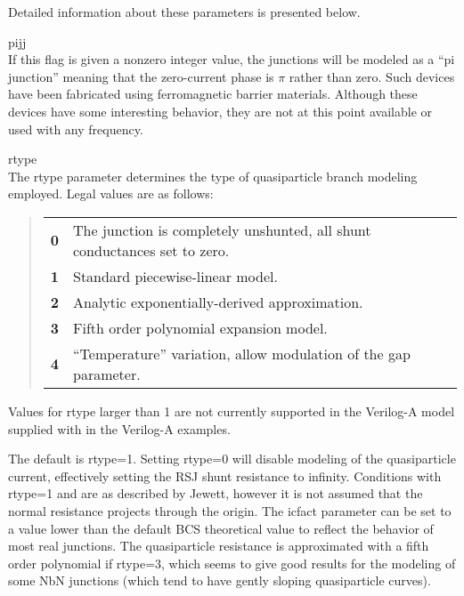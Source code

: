 Detailed information about these parameters is presented below.

\begin{description}
\item{\vt pijj}\\
If this flag is given a nonzero integer value, the junctions will be
modeled as a ``pi junction'' meaning that the zero-current phase is
$\pi$ rather than zero.  Such devices have been fabricated using
ferromagnetic barrier materials.  Although these devices have some
interesting behavior, they are not at this point available or used
with any frequency.

\item{\vt rtype}\\
The {\vt rtype} parameter determines the type of quasiparticle branch
modeling employed.  Legal values are as follows:

\begin{quote}
\begin{tabular}{ll}
\bf 0 & The junction is completely unshunted, all shunt conductances
 set to zero.\\
\bf 1 & Standard piecewise-linear model.\\
\bf 2 & Analytic exponentially-derived approximation.\\
\bf 3 & Fifth order polynomial expansion model.\\
\bf 4 & ``Temperature'' variation, allow modulation of the gap parameter.\\
\end{tabular}
\end{quote}

Values for {\vt rtype} larger than 1 are not currently supported in
the Verilog-A model supplied with {\WRspice} in the Verilog-A
examples.

The default is {\vt rtype=1}.  Setting {\vt rtype=0} will disable
modeling of the quasiparticle current, effectively setting the RSJ
shunt resistance to infinity.  Conditions with {\vt rtype=1} and {} are as described by Jewett, however it is not assumed that the
normal resistance projects through the origin.  The {\vt icfact}
parameter can be set to a value lower than the default BCS theoretical
value to reflect the behavior of most real junctions.  The
quasiparticle resistance is approximated with a fifth order polynomial
if {\vt rtype=3}, which seems to give good results for the modeling of
some NbN junctions (which tend to have gently sloping quasiparticle
curves).


\end{description}
